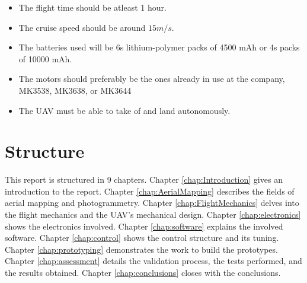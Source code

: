 \begin{itemize}

\item The flight time should be atleast 1 hour.
\item The cruise speed should be around $15 m/s$.
\item The batteries used will be 6s lithium-polymer packs of 4500 mAh or 4s packs of 10000 mAh.
\item The motors should preferably be the ones already in use at the company, MK3538, MK3638, or MK3644
\item The UAV must be able to take of and land autonomously.

\end{itemize}


\section{Structure}
	
%
This report is structured in 9 chapters.
%
Chapter \ref{chap:Introduction} gives an introduction to the report.
%
Chapter \ref{chap:AerialMapping} describes the fields of aerial mapping and photogrammetry.
%
Chapter \ref{chap:FlightMechanics} delves into the flight mechanics and the UAV's mechanical design.
%
Chapter \ref{chap:electronics} shows the electronics involved.
%
Chapter \ref{chap:software} explains the involved software.
%
Chapter \ref{chap:control} shows the control structure and its tuning.
%
Chapter \ref{chap:prototyping} demonstrates the work to build the prototypes.
%
Chapter \ref{chap:assessment} details the validation process, the tests performed, and the results obtained.
%
Chapter \ref{chap:conclusions} closes with the conclusions.

